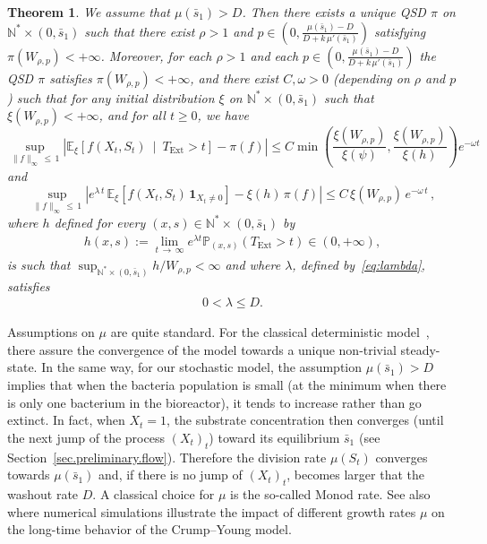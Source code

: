 \documentclass[10pt]{amsart}
\newtheorem{theo}{Theorem}[section]
\theoremstyle{definition}\newtheorem{defi}[theo]{Definition}\newtheorem{rema}[theo]{Remark}\newtheorem{exam}[theo]{Example}\newtheorem{exem}[theo]{Example}\newtheorem{nota}[theo]{Notation}
\newcommand{\PP}{\mathbb{P}}
\newcommand{\NN}{\mathbb{N}}
\newcommand{\EE}{\mathbb{E}}
\newcommand{\X}{\NN^* \times (0,\bar s_1)}
\newcommand{\Text}{T_{\mathrm{Ext}}}
\newcommand{\1}{\mathbf{1}}
\begin{document}
\begin{theo}\label{th:main-qsd}
We assume that $\mu(\bar s_1)>D$. Then there exists a unique QSD $\pi$ on $\NN^*\times (0,\bar s_1)$ such that there exist $\rho>1$ and $p\in(0,\frac{\mu(\bar s_1)-D}{D+k\,\mu'(\bar s_1)})$ satisfying $\pi(W_{\rho,p})<+\infty$. Moreover, for each $\rho>1$ and each $p\in(0,\frac{\mu(\bar s_1)-D}{D+k\,\mu'(\bar s_1)})$ the QSD $\pi$ satisfies $\pi(W_{\rho,p})<+\infty$, and there exist $C,\omega>0$ (depending on $\rho$ and $p$) such that for any initial distribution $\xi$ on $\NN^*\times (0, \bar s_1)$ such that $\xi(W_{\rho,p})<+\infty$, and for all $t\geq 0$, we have
\begin{equation}\label{eq:cv_qsd}
\sup_{\|f \|_\infty\,\leq\,1 } \left|\EE_\xi \left[f(X_t,S_t) \ \middle| \ \Text>t\right] - \pi(f) \right| \leq C \min\left(\frac{\xi\left(W_{\rho,p}\right)}{\xi(\psi)}, \frac{\xi\left(W_{\rho,p}\right)}{\xi(h)} \right) e^{-\omega t}
\end{equation}
and
\begin{equation}\label{eq:cv_qsd_X_eq_h}
\sup_{\|f \|_\infty \,\leq\,1 } \left|e^{\lambda \,t}\,\EE_\xi\left[f(X_t,S_t)\,\1_{X_t\neq 0}\right]-\xi(h)\,\pi(f)\right|\leq C\,\xi\left(W_{\rho,p}\right)\,e^{-\omega\,t}\,,
\end{equation}
where $h$ defined for every $(x,s) \in \NN^*\times(0, \bar s_1)$ by
\begin{align}\label{def:h}
h(x,s) := \lim_{t\,\to\,\infty} e^{\lambda t}\PP_{(x,s)} (\Text>t)\in (0,+\infty),
\end{align}
is such that $\sup_{\X}h/W_{\rho,p}<\infty$ and where $\lambda$, defined by~\eqref{eq:lambda}, satisfies
\begin{align}\label{eq:eigenvalue.bounds}
0< \lambda \leq D.
\end{align}
\end{theo}



Assumptions on $\mu$ are quite standard. For the classical deterministic model~\cite{SW95}, there assure the convergence of the model towards a unique non-trivial steady-state. In the same way, for our stochastic model, the assumption $\mu(\bar s_1)>D$ implies that when the bacteria population is small (at the minimum when there is only one bacterium in the bioreactor), it tends to increase rather than go extinct. In fact, when $X_t=1$, the substrate concentration then converges (until the next jump of the process $(X_t)_t$) toward its equilibrium $\bar s_1$ (see Section~\ref{sec.preliminary.flow}). Therefore the division rate $\mu(S_t)$ converges towards $\mu(\bar s_1)$ and, if there is no jump of $(X_t)_t$, becomes larger that the washout rate $D$. A classical choice for $\mu$ is the so-called Monod rate. See also~\cite{CF17} where numerical simulations illustrate the impact of different growth rates $\mu$ on the long-time behavior of the Crump--Young model.
\end{document}

